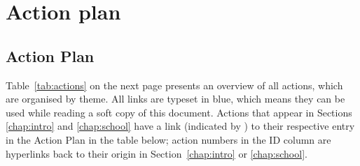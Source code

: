 

\chapter{Action plan}\label{chap:actionplan}




\section{Action Plan}
Table~\ref{tab:actions} on the next page presents an overview of all actions, which are organised by theme. All links are typeset in \textcolor{titlebgdark}{blue}, which means they can be used while reading a soft copy of this document. Actions that appear in Sections \ref{chap:intro} and \ref{chap:school} have a link (indicated by \gotoactionsymbol{}) to their respective entry in the Action Plan in the table below; action numbers in the ID column are hyperlinks back to their origin in Section~\ref{chap:intro} or \ref{chap:school}.\\[.1in]




